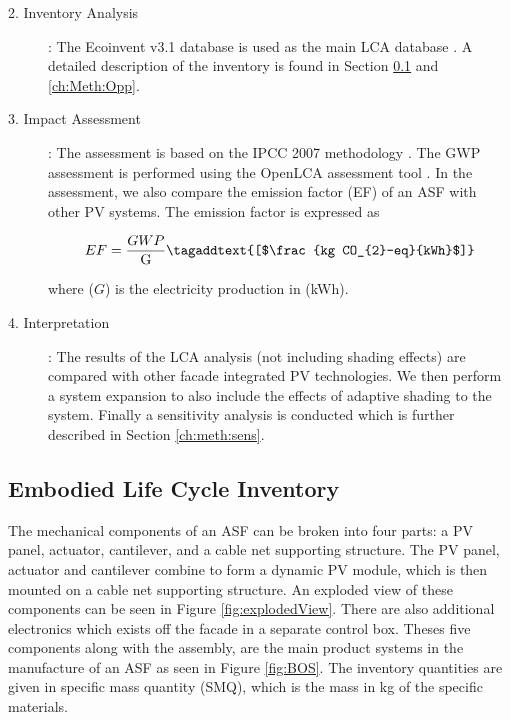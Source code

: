 \begin{description}
\item[2. Inventory Analysis]: The Ecoinvent v3.1 database is used as the main LCA database \cite{frischknecht2005ecoinvent}. A detailed description of the inventory is found in Section \ref{ch:meth:Embodied} and \ref{ch:Meth:Opp}.

\item[3. Impact Assessment]: The assessment is based on the IPCC 2007 methodology \cite{solomon2007climate}. The GWP assessment is performed using the OpenLCA assessment tool \cite{ciroth2007ict}. In the assessment, we also compare the emission factor (EF) of an ASF with other PV systems. The emission factor is expressed as

\begin{equation}
EF=\frac{GWP}{\mathrm{G}}   
\tagaddtext{[$\frac{kg CO_{2}-eq}{kWh}$]}
\label{eq:EF}
\end{equation}

where ($G$) is the electricity production in (kWh).


\item[4. Interpretation]: The results of the LCA analysis (not including shading effects) are compared with other facade integrated PV technologies. We then perform a system expansion to also include the effects of adaptive shading to the system. Finally a sensitivity analysis is conducted which is further described in Section \ref{ch:meth:sens}.


\end{description}

\subsection{Embodied Life Cycle Inventory}
\label{ch:meth:Embodied}


The mechanical components of an ASF can be broken into four parts: a PV panel, actuator, cantilever, and a cable net supporting structure. The PV panel, actuator and cantilever combine to form a dynamic PV module, which is then mounted on a cable net supporting structure. An exploded view of these components can be seen in Figure \ref{fig:explodedView}. There are also additional electronics which exists off the facade in a separate control box. Theses five components along with the assembly, are the main product systems in the manufacture of an ASF as seen in Figure \ref{fig:BOS}. The inventory quantities are given in specific mass quantity (SMQ), which is the mass in kg of the specific materials.


